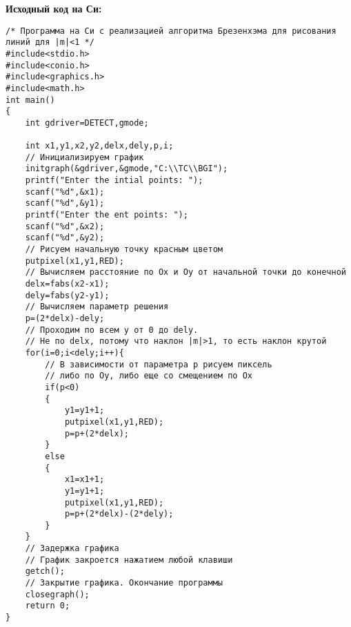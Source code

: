 \textbf{Исходный код на Си:}
\begin{tcolorbox}
\begin{verbatim}
/* Программа на Си с реализацией алгоритма Брезенхэма для рисования линий для |m|<1 */
#include<stdio.h>
#include<conio.h>
#include<graphics.h>
#include<math.h>
int main()
{
    int gdriver=DETECT,gmode;
    
    int x1,y1,x2,y2,delx,dely,p,i;
    // Инициализируем график
    initgraph(&gdriver,&gmode,"C:\\TC\\BGI");
    printf("Enter the intial points: ");
    scanf("%d",&x1);
    scanf("%d",&y1);
    printf("Enter the ent points: ");
    scanf("%d",&x2);
    scanf("%d",&y2);
    // Рисуем начальную точку красным цветом
    putpixel(x1,y1,RED);
    // Вычисляем расстояние по Ox и Oy от начальной точки до конечной
    delx=fabs(x2-x1);
    dely=fabs(y2-y1);
    // Вычисляем параметр решения
    p=(2*delx)-dely;
    // Проходим по всем y от 0 до dely.
    // Не по delx, потому что наклон |m|>1, то есть наклон крутой
    for(i=0;i<dely;i++){
        // В зависимости от параметра p рисуем пиксель
        // либо по Oy, либо еще со смещением по Ox
        if(p<0)
        {
            y1=y1+1;
            putpixel(x1,y1,RED);
            p=p+(2*delx);
        }
        else
        {
            x1=x1+1;
            y1=y1+1;
            putpixel(x1,y1,RED);
            p=p+(2*delx)-(2*dely);
        }
    }
    // Задержка графика
    // График закроется нажатием любой клавиши
    getch();
    // Закрытие графика. Окончание программы
    closegraph();
    return 0;
}
\end{verbatim}
\end{tcolorbox}